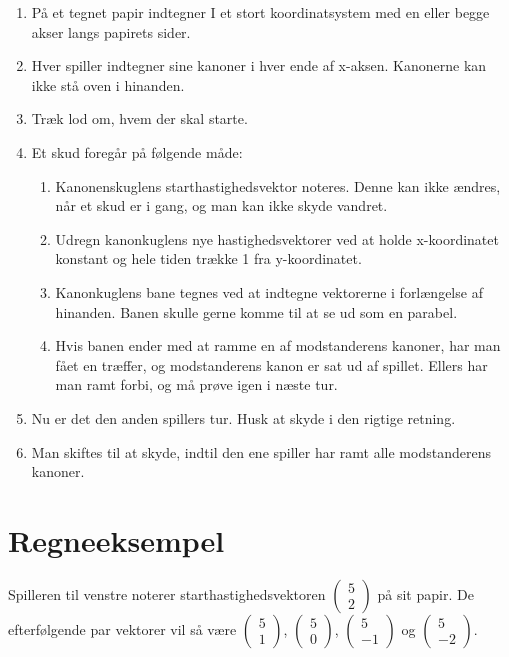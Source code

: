 \documentclass[a4paper, 12pt]{article}
\begin{document}
\begin{enumerate}
\item På et tegnet papir indtegner I et stort koordinatsystem med en eller begge akser langs papirets sider.
\item Hver spiller indtegner sine kanoner i hver ende af x-aksen. Kanonerne kan ikke stå oven i hinanden.
\item Træk lod om, hvem der skal starte.
\item Et skud foregår på følgende måde:
\begin{enumerate}
\item Kanonenskuglens starthastighedsvektor noteres. Denne kan ikke ændres, når et skud er i gang, og man kan ikke skyde vandret.
\item Udregn kanonkuglens nye hastighedsvektorer ved at holde x-koordinatet konstant og hele tiden trække 1 fra y-koordinatet.
\item Kanonkuglens bane tegnes ved at indtegne vektorerne i forlængelse af hinanden. Banen skulle gerne komme til at se ud som en parabel.
\item Hvis banen ender med at ramme en af modstanderens kanoner, har man fået en træffer, og modstanderens kanon er sat ud af spillet. Ellers har man ramt forbi, og må prøve igen i næste tur.
\end{enumerate}
\item Nu er det den anden spillers tur. Husk at skyde i den rigtige retning.
\item Man skiftes til at skyde, indtil den ene spiller har ramt alle modstanderens kanoner.
\end{enumerate}


\section*{Regneeksempel}
\label{sec:orgf568038}
Spilleren til venstre noterer starthastighedsvektoren \(\begin{pmatrix} 5 \\ 2 \end{pmatrix}\) på sit papir. De efterfølgende par vektorer vil så være \(\begin{pmatrix} 5 \\ 1 \end{pmatrix}\), \(\begin{pmatrix} 5 \\ 0 \end{pmatrix}\), \(\begin{pmatrix} 5 \\ -1 \end{pmatrix}\) og \(\begin{pmatrix} 5 \\ -2 \end{pmatrix}\).
\end{document}
